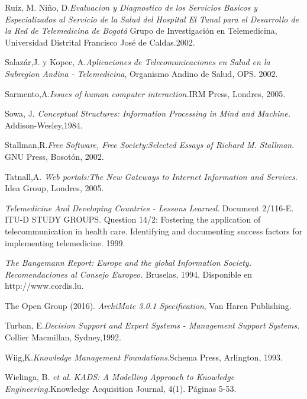 \begin{thebibliography}{}
 Ruiz, M. Niño, D.\textit{Evaluacion y Diagnostico de los Servicios Basicos y Especializados al Servicio de la Salud del Hospital El Tunal para el Desarrollo de la Red de Telemedicina de Bogotá} Grupo de Investigación en Telemedicina,  Universidad Distrital Francisco José de Caldas.2002.

 Salazár,J. y Kopec, A.\textit{Aplicaciones de Telecomunicaciones en Salud en la Subregion Andina - Telemedicina}, Organismo Andino de Salud, OPS. 2002.

 Sarmento,A.\textit{Issues of human computer interaction}.IRM Press, Londres, 2005. 

 Sowa, J. \textit{Conceptual Structures: Information Processing in Mind and Machine.} Addison-Wesley,1984.

 Stallman,R.\textit{Free Software, Free Society:Selected Essays of Richard M. Stallman}. GNU Press, Bosotón, 2002.

 Tatnall,A. \textit{Web portals:The New Gateways to Internet Information and Services.} Idea Group, Londres, 2005.

 \textit{Telemedicine And Developing Countries - Lessons Learned}. Document 2/116-E. ITU-D STUDY GROUPS. Question 14/2: Fostering the application of telecommunication in health care.  Identifying and documenting success factors for implementing telemedicine. 1999.

 \textit{The Bangemann Report: Europe and the global Information Society. Recomendaciones al Consejo Europeo.} Bruselas, 1994. Disponible en http://www.cordis.lu.

 The Open Group (2016). \textit{ArchiMate 3.0.1 Specification}, Van Haren Publishing.

 Turban, E.\textit{Decision Support and Expert Systems - Management Support Systems.} Collier Macmillan, Sydney,1992.

 Wiig,K.\textit{Knowledge Management Foundations}.Schema Press, Arlington, 1993. 

 Wielinga, B. \textit{et al}. \textit{KADS: A Modelling Approach to Knowledge Engineering.}Knowledge Acquisition Journal, 4(1). Páginas 5-53.


\end{thebibliography}
